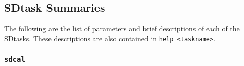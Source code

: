 
\subsection{SDtask Summaries}
\label{section:sd.sdtasks.tasks}

The following are the list of parameters and
brief descriptions of each of the SDtasks.
These descriptions are also contained in {\tt help <taskname>}.

\subsubsection{{\tt sdcal}}
\label{section:sd.sdtasks.tasks.sdcal}

